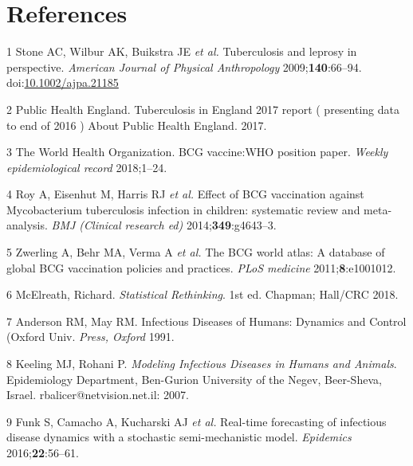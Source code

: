 \documentclass[11pt,twoside]{bristolthesis}
\begin{document}
  \backmatter
  
  \hypertarget{references}{%
  \chapter{References}\label{references}}
  
  \noindent
  
  \setlength{\parindent}{-0.20in}
  \setlength{\leftskip}{0.20in}
  \setlength{\parskip}{8pt}
  
  \hypertarget{refs}{}
  \leavevmode\hypertarget{ref-Stone2009}{}%
  1 Stone AC, Wilbur AK, Buikstra JE \emph{et al.} Tuberculosis and leprosy in perspective. \emph{American Journal of Physical Anthropology} 2009;\textbf{140}:66--94. doi:\href{https://doi.org/10.1002/ajpa.21185}{10.1002/ajpa.21185}
  
  \leavevmode\hypertarget{ref-PHE2017}{}%
  2 Public Health England. Tuberculosis in England 2017 report ( presenting data to end of 2016 ) About Public Health England. 2017.
  
  \leavevmode\hypertarget{ref-TheWorldHealthOrganization:2018va}{}%
  3 The World Health Organization. BCG vaccine:WHO position paper. \emph{Weekly epidemiological record} 2018;1--24.
  
  \leavevmode\hypertarget{ref-Roy2014}{}%
  4 Roy A, Eisenhut M, Harris RJ \emph{et al.} Effect of BCG vaccination against Mycobacterium tuberculosis infection in children: systematic review and meta-analysis. \emph{BMJ (Clinical research ed)} 2014;\textbf{349}:g4643--3.
  
  \leavevmode\hypertarget{ref-Zwerling2011a}{}%
  5 Zwerling A, Behr MA, Verma A \emph{et al.} The BCG world atlas: A database of global BCG vaccination policies and practices. \emph{PLoS medicine} 2011;\textbf{8}:e1001012.
  
  \leavevmode\hypertarget{ref-McElreath:2018j}{}%
  6 McElreath, Richard. \emph{Statistical Rethinking}. 1st ed. Chapman; Hall/CRC 2018.
  
  \leavevmode\hypertarget{ref-Anderson1991}{}%
  7 Anderson RM, May RM. Infectious Diseases of Humans: Dynamics and Control (Oxford Univ. \emph{Press, Oxford} 1991.
  
  \leavevmode\hypertarget{ref-Keeling2007}{}%
  8 Keeling MJ, Rohani P. \emph{Modeling Infectious Diseases in Humans and Animals}. Epidemiology Department, Ben-Gurion University of the Negev, Beer-Sheva, Israel. rbalicer@netvision.net.il: 2007.
  
  \leavevmode\hypertarget{ref-Funk2016a}{}%
  9 Funk S, Camacho A, Kucharski AJ \emph{et al.} Real-time forecasting of infectious disease dynamics with a stochastic semi-mechanistic model. \emph{Epidemics} 2016;\textbf{22}:56--61.
  
\end{document}

